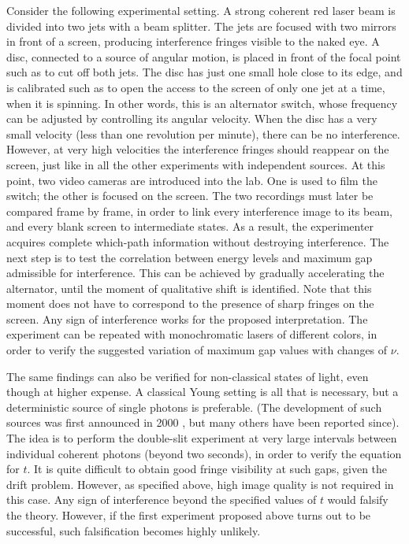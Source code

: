 \documentclass[a4paper,aps,prl,twocolumn,showpacs]{revtex4}
\begin{document}
Consider the following experimental setting. A strong coherent red
laser beam is divided into two jets with a beam splitter. The jets
are focused with two mirrors in front of a screen, producing
interference fringes visible to the naked eye. A disc, connected
to a source of angular motion, is placed in front of the focal
point such as to cut off both jets. The disc has just one small
hole close to its edge, and is calibrated such as to open the
access to the screen of only one jet at a time, when it is
spinning. In other words, this is an alternator switch, whose
frequency can be adjusted by controlling its angular velocity.
When the disc has a very small velocity (less than one revolution
per minute), there can be no interference. However, at very high
velocities the interference fringes should reappear on the screen,
just like in all the other experiments with independent sources.
At this point, two video cameras are introduced into the lab. One
is used to film the switch; the other is focused on the screen.
The two recordings must later be compared frame by frame, in order
to link every interference image to its beam, and every blank
screen to intermediate states. As a result, the experimenter
acquires complete which-path information without destroying
interference. The next step is to test the correlation between
energy levels and maximum gap admissible for interference. This
can be achieved by gradually accelerating the alternator, until
the moment of qualitative shift is identified. Note that this
moment does not have to correspond to the presence of sharp
fringes on the screen. Any sign of interference works for the
proposed interpretation. The experiment can be repeated with
monochromatic lasers of different colors, in order to verify the
suggested variation of maximum gap values with changes of $\nu$.

The same findings can also be verified for non-classical states of
light, even though at higher expense. A classical Young setting is
all that is necessary, but a deterministic source of single
photons is preferable. (The development of such sources was first
announced in 2000 \cite{mich,sant,loun}, but many others have been
reported since). The idea is to perform the double-slit experiment
at very large intervals between individual coherent photons
(beyond two seconds), in order to verify the equation for $t$. It
is quite difficult to obtain good fringe visibility at such gaps,
given the drift problem. However, as specified above, high image
quality is not required in this case. Any sign of interference
beyond the specified values of $t$ would falsify the theory.
However, if the first experiment proposed above turns out to be
successful, such falsification becomes highly unlikely.
\end{document}
